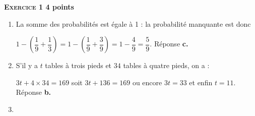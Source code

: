 \textbf{\textsc{Exercice 1} \hfill 4 points}

\medskip

%
 
\begin{enumerate}
\item %



La somme des probabilités est égale à 1  : la probabilité manquante est donc 

$1 - \left(\dfrac{1}{9} + \dfrac{1}{3} \right) = 1 - \left(\dfrac{1}{9} + \dfrac{3}{9} \right) = 1 - \dfrac{4}{9} = \dfrac{5}{9}$. Réponse \textbf{c.} 
\item %
 
S'il y a $t$ tables à trois pieds et $34$ tables à quatre pieds, on a :

$3t + 4 \times 34 = 169$ soit $3t + 136 = 169$ ou encore $3t = 33$ et enfin $t = 11$. Réponse \textbf{b.} 
\medskip
\item %
 

\end{enumerate}

